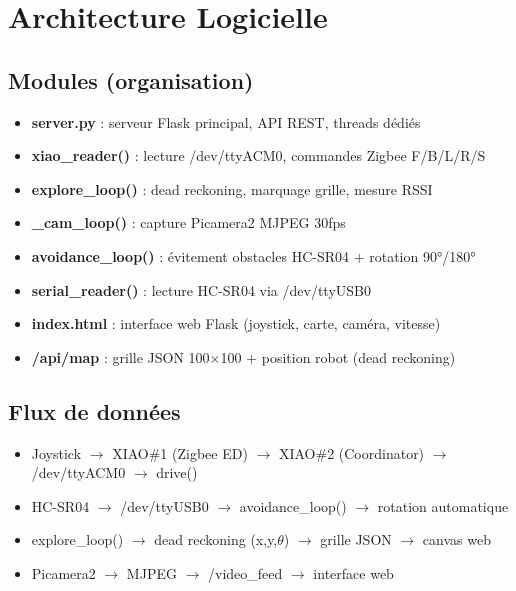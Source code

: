 \documentclass[a4paper,12pt]{report}
\begin{document}
\chapter{Architecture Logicielle}

\section{Modules (organisation)}
\begin{itemize}
    \item \textbf{server.py} : serveur Flask principal, API REST, threads dédiés
    \item \textbf{xiao\_reader()} : lecture /dev/ttyACM0, commandes Zigbee F/B/L/R/S
    \item \textbf{explore\_loop()} : dead reckoning, marquage grille, mesure RSSI
    \item \textbf{\_cam\_loop()} : capture Picamera2 MJPEG 30fps
    \item \textbf{avoidance\_loop()} : évitement obstacles HC-SR04 + rotation 90°/180°
    \item \textbf{serial\_reader()} : lecture HC-SR04 via /dev/ttyUSB0
    \item \textbf{index.html} : interface web Flask (joystick, carte, caméra, vitesse)
    \item \textbf{/api/map} : grille JSON 100×100 + position robot (dead reckoning)
\end{itemize}

\section{Flux de données}
\begin{itemize}
    \item Joystick $\rightarrow$ XIAO\#1 (Zigbee ED) $\rightarrow$ XIAO\#2 (Coordinator) $\rightarrow$ /dev/ttyACM0 $\rightarrow$ drive()
    \item HC-SR04 $\rightarrow$ /dev/ttyUSB0 $\rightarrow$ avoidance\_loop() $\rightarrow$ rotation automatique
    \item explore\_loop() $\rightarrow$ dead reckoning (x,y,$\theta$) $\rightarrow$ grille JSON $\rightarrow$ canvas web
    \item Picamera2 $\rightarrow$ MJPEG $\rightarrow$ /video\_feed $\rightarrow$ interface web
\end{itemize}
\end{document}
